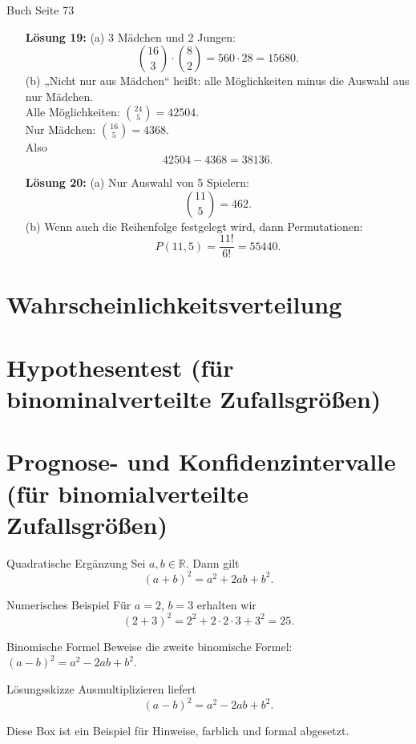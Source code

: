 \documentclass[11pt,a4paper,oneside]{article}
\begin{document}
\begin{loesung}{Buch Seite 73}
\begin{itemize}[left=20mm]
			\item[\textbf{Lösung 19:}] 
			(a) 3 Mädchen und 2 Jungen: 
			\[ \binom{16}{3} \cdot \binom{8}{2} = 560 \cdot 28 = 15680. \]
			(b) „Nicht nur aus Mädchen“ heißt: alle Möglichkeiten minus die Auswahl aus nur Mädchen. \\
			Alle Möglichkeiten: \( \binom{24}{5} = 42504 \). \\
			Nur Mädchen: \( \binom{16}{5} = 4368 \). \\
			Also 
			\[ 42504 - 4368 = 38136. \]
			
			\item[\textbf{Lösung 20:}] 
			(a) Nur Auswahl von 5 Spielern: 
			\[ \binom{11}{5} = 462. \]
			(b) Wenn auch die Reihenfolge festgelegt wird, dann Permutationen: 
			\[ P(11,5) = \frac{11!}{6!} = 55440. \]
		\end{itemize}
	\end{loesung}
	
	\newpage
	
	
	
	
	
	\newpage
	
	\section{Wahrscheinlichkeitsverteilung}
	
	\section{Hypothesentest (für binominalverteilte Zufallsgrößen)}
	
	\section{Prognose- und Konfidenzintervalle (für binomialverteilte Zufallsgrößen)}
	
	\newpage
	
	
	\begin{theo}{Quadratische Ergänzung}
		Sei \(a,b\in \mathbb{R}\). Dann gilt
		\[
		(a+b)^2 = a^2 + 2ab + b^2.
		\]
	\end{theo}
	
	\begin{exem}{Numerisches Beispiel}
		Für \(a=2\), \(b=3\) erhalten wir
		\[
		(2+3)^2 = 2^2 + 2\cdot 2\cdot 3 + 3^2 = 25.
		\]
	\end{exem}
	
	\begin{aufgabe}{Binomische Formel}
		Beweise die zweite binomische Formel: \((a-b)^2 = a^2 - 2ab + b^2\).
	\end{aufgabe}
	
	\begin{loesung}{Lösungsskizze}
		Ausmultiplizieren liefert
		\[
		(a-b)^2 = a^2 - 2ab + b^2.
		\]
	\end{loesung}
	
	\begin{infobox}
		Diese Box ist ein Beispiel für Hinweise, farblich und formal abgesetzt.
	\end{infobox}
	
\end{document}

